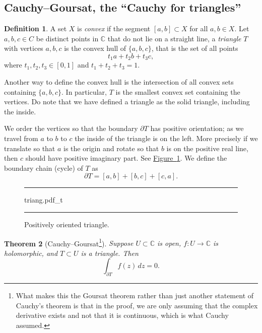 \documentclass[12pt,openany]{book}
\newcommand{\C}{{\mathbb{C}}}
\newcommand{\myindex}[1]{#1\index{#1}}
\theoremstyle{plain}
\newtheorem{thm}{Theorem}[section]
\theoremstyle{remark}
\theoremstyle{definition}
\newtheorem{defn}[thm]{Definition}
\newenvironment{myfig}{%
\begin{figure}[h!t]
\noindent\rule{\textwidth}{0.4pt}\vspace{12pt}\par\centering}%
{\par\noindent\rule{\textwidth}{0.4pt}
\end{figure}}
\theoremstyle{exercise}
\theoremstyle{example}
\newcommand{\figureref}[1]{\hyperref[#1]{Figure~\ref*{#1}}}
\begin{document}
\subsection{Cauchy--Goursat, the ``Cauchy for triangles''}

\begin{defn}
A set $X$ is \emph{\myindex{convex}} if the segment $[a,b] \subset X$ for all $a,b \in
X$.
Let $a,b,c \in C$ be distinct points in $\C$ that do not lie on a
straight line, a \emph{\myindex{triangle}} $T$
with vertices $a,b,c$ is the convex hull
of $\{ a,b,c \}$, that is
the set of all points
\begin{equation*}
t_1 a + t_2 b + t_3 c ,
\end{equation*}
where $t_1,t_2,t_3 \in [0,1]$ and $t_1+t_2+t_3 = 1$.
\end{defn}

Another way to define
the convex hull is the intersection of all convex sets containing $\{ a,b,c \}$.
In particular, $T$ is the smallest convex set containing the vertices.
Do note that we have defined a triangle as the solid triangle, including
the inside.

We order the vertices so that the boundary $\partial T$ has positive orientation;
as we travel from $a$ to $b$ to $c$ the inside of the triangle 
is on the left.  More precisely if we translate so that $a$ is
the origin and rotate so that $b$ is on the positive real line, then $c$
should have positive imaginary part.  See \figureref{fig:triang}.  We define the boundary chain (cycle)
of $T$ as
\begin{equation*}
\partial T = [a,b] + [b,c] + [c,a] .
\end{equation*}
\begin{myfig}
{triang.pdf_t}
\caption{Positively oriented triangle.%
\label{fig:triang}}
\end{myfig}

\begin{thm}[Cauchy--Goursat\footnote{%
What makes this the Goursat theorem
rather than just another statement of Cauchy's theorem
is that in the proof, we are only assuming that the complex derivative exists
and not that it is continuous, which is what Cauchy assumed.}]
Suppose $U \subset \C$ is open, $f \colon U \to \C$ is
holomorphic,
and $T \subset U$ is a triangle.  Then
\begin{equation*}
\int_{\partial T} f(z) \, dz = 0 .
\end{equation*}
\end{thm}
\end{document}
